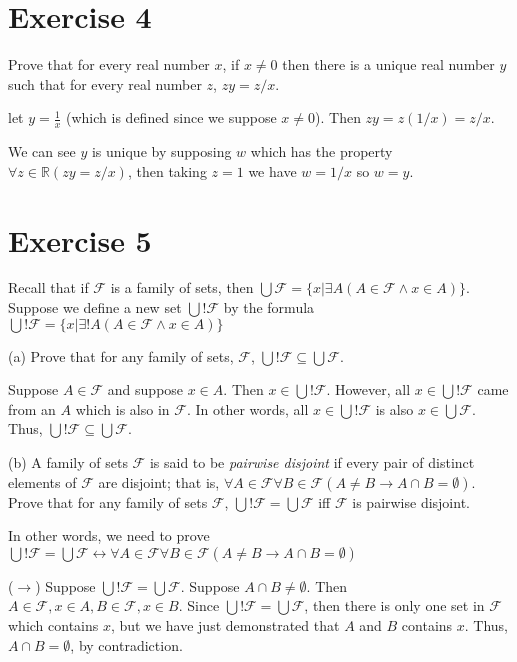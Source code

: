 \documentclass[11pt]{article}
\newcommand{\then}{\rightarrow}
\newcommand{\bicond}{\leftrightarrow}
\newcommand{\family}[1]{\mathcal{#1}}
\begin{document}
\section*{Exercise 4}

Prove that for every real number $x$, if $x \neq 0$ then there is a unique real 
number $y$ such that for every real number $z$, $zy = z/x$.

let $y = \frac{1}{x}$ (which is defined since we suppose $x \neq 0$).
Then $zy = z(1/x) = z/x$.

We can see $y$ is unique by supposing $w$ which has the property
$\forall z \in \mathbb{R} (zy = z/x)$, then taking $z = 1$ we have $w = 1/x$
so $w = y$.

\section*{Exercise 5}

Recall that if $\family{F}$ is a family of sets, then 
$\bigcup \family{F} = \{ x | \exists A (A \in \family{F} \wedge x \in A) \}$.
Suppose we define a new set $\bigcup! \family{F}$ by the formula 
$\bigcup! \family{F} = \{ x | \exists! A (A \in \family{F} \wedge x \in A) \}$

\noindent (a) Prove that for any family of sets, $\family{F}$, 
$\bigcup! \family{F} \subseteq \bigcup \family{F}$.

Suppose $A \in \family{F}$ and suppose $x \in A$. Then $x \in \bigcup! \family{F}$.
However, all $x \in \bigcup! \family{F}$ came from an $A$ which is also in 
$\family{F}$. In other words, all $x \in \bigcup! \family{F}$ is also 
$x \in \bigcup \family{F}$. 
Thus, $\bigcup! \family{F} \subseteq \bigcup \family{F}$.

\noindent (b) A family of sets $\family{F}$ is said to be 
\textit{pairwise disjoint} if every pair of distinct elements of $\family{F}$ are 
disjoint; that is, 
$\forall A \in \family{F} \forall B \in \family{F} (A \neq B \then A \cap B = \emptyset)$.
Prove that for any family of sets $\family{F}$, 
$\bigcup! \family{F} = \bigcup \family{F}$ iff $\family{F}$ is pairwise disjoint.

In other words, we need to prove 
$\bigcup! \family{F} = \bigcup \family{F} \bicond 
\forall A \in \family{F} \forall B \in \family{F} (A \neq B \then A \cap B = \emptyset)$

($\rightarrow$) Suppose $\bigcup! \family{F} = \bigcup \family{F}$. Suppose 
$A \cap B \neq \emptyset$. Then $A \in \family{F}, x \in A, B \in \family{F},
x \in B$. Since $\bigcup! \family{F} = \bigcup \family{F}$, then there is only 
one set in $\family{F}$ which contains $x$, but we have just demonstrated that 
$A$ and $B$ contains $x$. Thus, $A \cap B = \emptyset$, by contradiction.
\end{document}
